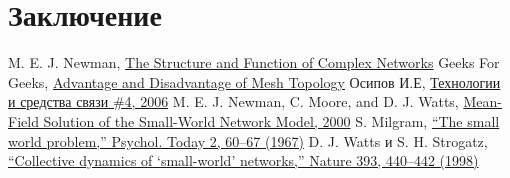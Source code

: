 \documentclass[a4paper]{article}
\begin{document}
\section{Заключение}

\begin{thebibliography}{}
     M. E. J. Newman,  \href{https://github.com/julproh/Thesis}{The Structure and Function of Complex Networks}
     Geeks For Geeks,  \href{https://www.geeksforgeeks.org/advantage-and-disadvantage-of-mesh-topology/}{Advantage and Disadvantage of Mesh Topology}
     Осипов И.Е,  \href{http://lib.tssonline.ru/articles2/fix-op/mesh_seti_techn_prilozh_oborud}{Технологии и средства связи \#4, 2006}
     M. E. J. Newman, C. Moore, and D. J. Watts,  \href{https://journals.aps.org/prl/abstract/10.1103/PhysRevLett.84.3201}{Mean-Field Solution of the Small-World Network Model, 2000}
     S. Milgram, \href{http://snap.stanford.edu/class/cs224w-readings/milgram67smallworld.pdf}{“The small world problem,” Psychol. Today 2, 60–67 (1967)} 
     D. J. Watts и S. H. Strogatz, \href{https://www.nature.com/articles/30918}{“Collective dynamics of ‘small-world’ networks,” Nature 393, 440–442 (1998)}
\end{thebibliography}
\end{document}

